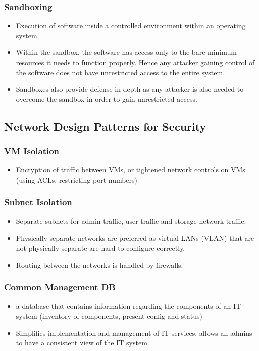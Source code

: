 \documentclass{article}
\begin{document}
\subsubsection{Sandboxing}
\begin{itemize}
    \item Execution of software inside a controlled environment within an operating system.
    
    \item Within the sandbox, the software has access only to the bare minimum resources it needs to function properly. Hence any attacker gaining control of the software does not have unrestricted access to the entire system.
    
    \item Sandboxes also provide defense in depth as any attacker is also needed to overcome the sandbox in order to gain unrestricted access. 
\end{itemize}

\subsection{Network Design Patterns for Security}
\subsubsection{VM Isolation}
\begin{itemize}
    \item Encryption of traffic between VMs, or tightened network controls on VMs (using ACLs, restricting port numbers)
\end{itemize}

\subsubsection{Subnet Isolation}
\begin{itemize}
    \item Separate subnets for admin traffic, user traffic and storage network traffic.
    
    \item Physically separate networks are preferred as virtual LANs (VLAN) that are not physically separate are hard to configure correctly.
    
    \item Routing between the networks is handled by firewalls.
\end{itemize}

\subsubsection{Common Management DB}
\begin{itemize}
    \item a database that contains information regarding the components of an IT system (inventory of components, present config and status)
    
    \item Simplifies implementation and management of IT services, allows all admins to have a consistent view of the IT system. 
\end{itemize}
\end{document}

